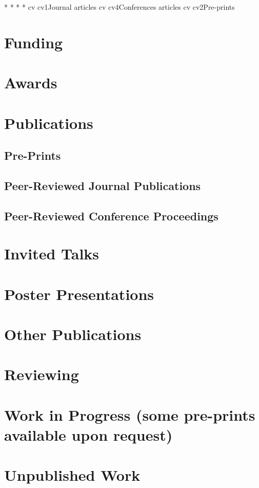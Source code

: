 \documentclass[10pt,colorlinks=true,urlcolor=blue]{moderncv}
\begin{document}
\nocite{pub}{*}
\nocite{conf}{*}
\nocite{misc}{*}
\nocite{talks}{*}
{cv}
{cv1}{Journal articles}
{cv}
{cv4}{Conferences articles}
{cv}
{cv2}{Pre-prints}

\section{Funding}



\section{Awards}

\section{Publications}

\subsection{Pre-Prints}

\subsection{Peer-Reviewed Journal Publications}

\subsection{Peer-Reviewed Conference Proceedings}

\section{Invited Talks}

\section{Poster Presentations}

\section{Other Publications}

\section{Reviewing}

\section{Work in Progress (some pre-prints available upon request)}

\section{Unpublished Work}
\end{document}
